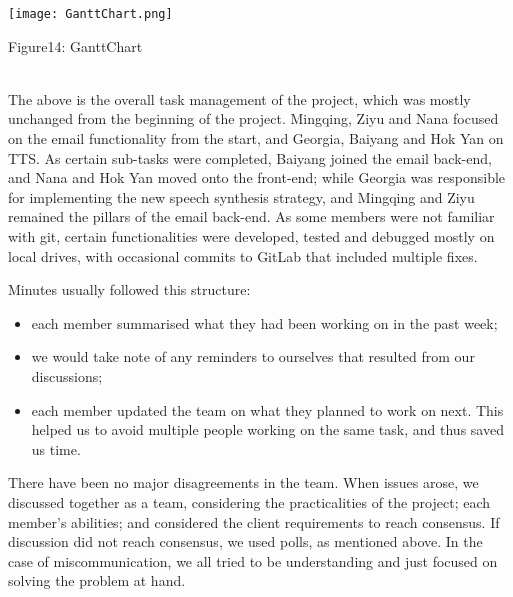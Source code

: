 \documentclass{article}
\begin{document}
\texttt{[image: GanttChart.png]} \\
\begin{center}
Figure14: GanttChart
\end{center}
\\
The above is the overall task management of the project, which was mostly unchanged from the beginning of the project. Mingqing, Ziyu and Nana focused on the email functionality from the start, and Georgia, Baiyang and Hok Yan on TTS. As certain sub-tasks were completed, Baiyang joined the email back-end, and Nana and Hok Yan moved onto the front-end; while Georgia was responsible for implementing the new speech synthesis strategy, and Mingqing and Ziyu remained the pillars of the email back-end. As some members were not familiar with git, certain functionalities were developed, tested and debugged mostly on local drives, with occasional commits to GitLab that included multiple fixes.


Minutes usually followed this structure: 
\begin{itemize}
    \item  each member summarised what they had been working on in the past week; 
    \item  we would take note of any reminders to ourselves that resulted from our discussions; 
    \item each member updated the team on what they planned to work on next. This helped us to avoid multiple people working on the same task, and thus saved us time.
\end{itemize}

There have been no major disagreements in the team. When issues arose, we discussed together as a team, considering the practicalities of the project; each member's abilities; and considered the client requirements to reach consensus. If discussion did not reach consensus, we used polls, as mentioned above. In the case of miscommunication, we all tried to be understanding and just focused on solving the problem at hand.
\end{document}
